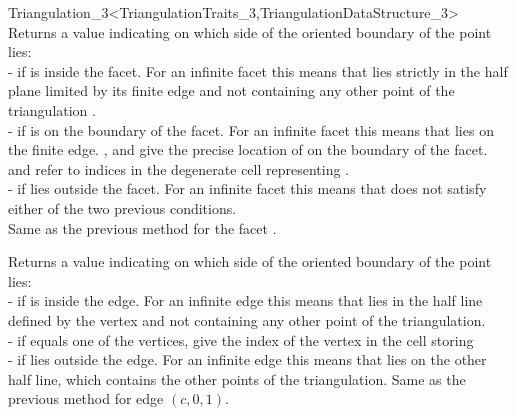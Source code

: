 \begin{ccRefClass}{Triangulation_3<TriangulationTraits_3,TriangulationDataStructure_3>}
{Returns a value indicating on which side of the oriented boundary
of  the point  lies:\\
-  if  is inside the facet. For an
infinite facet this means that  lies strictly in the half plane
limited by its finite edge and not containing any other point of the
triangulation . \\
-  if  is on the boundary of the facet.
For an infinite facet this means that  lies on the finite
edge. ,  and  give the precise location of
 on the boundary of the facet.  and  refer to
indices in the degenerate cell  representing .\\
-  if  lies outside the facet. For
an infinite facet this means that  does not satisfy either of
the two previous conditions. \\
}
\ccGlue
{}
{Same as the previous method for the facet .}

{Returns a value indicating on which side of the oriented boundary
of  the point  lies:\\
-  if  is inside the edge. For an
infinite edge this means that  lies in the half line defined by
the vertex and not containing any other point of the triangulation.\\ 
-  if  equals one of the vertices,
 give the index of the vertex in the cell storing \\
-  if  lies outside the edge. For
an infinite edge this means that  lies on the other half line,
which contains the other points of the triangulation.
}
\ccGlue
{}
{Same as the previous method for edge $(c,0,1)$.}


\end{ccRefClass}
